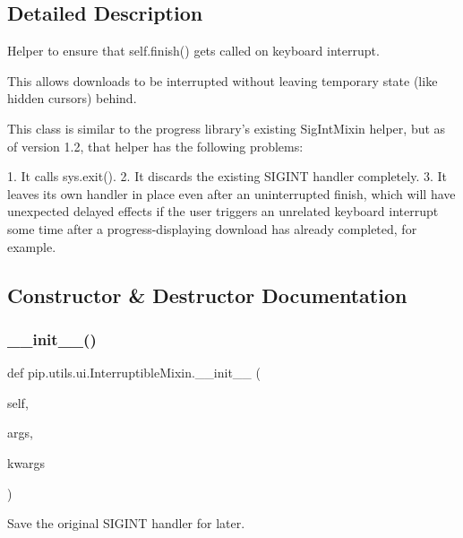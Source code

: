 \subsection{Detailed Description}
\begin{DoxyVerb}Helper to ensure that self.finish() gets called on keyboard interrupt.

This allows downloads to be interrupted without leaving temporary state
(like hidden cursors) behind.

This class is similar to the progress library's existing SigIntMixin
helper, but as of version 1.2, that helper has the following problems:

1. It calls sys.exit().
2. It discards the existing SIGINT handler completely.
3. It leaves its own handler in place even after an uninterrupted finish,
   which will have unexpected delayed effects if the user triggers an
   unrelated keyboard interrupt some time after a progress-displaying
   download has already completed, for example.
\end{DoxyVerb}
 

\subsection{Constructor \& Destructor Documentation}
\mbox{\label{classpip_1_1utils_1_1ui_1_1_interruptible_mixin_a2af170c5c8ea547803596b94fd457f35}} 
\subsubsection{\texorpdfstring{\+\_\+\+\_\+init\+\_\+\+\_\+()}{\_\_init\_\_()}}
{\footnotesize\ttfamily def pip.\+utils.\+ui.\+Interruptible\+Mixin.\+\_\+\+\_\+init\+\_\+\+\_\+ (\begin{DoxyParamCaption}\item[{}]{self,  }\item[{}]{args,  }\item[{}]{kwargs }\end{DoxyParamCaption})}

\begin{DoxyVerb}Save the original SIGINT handler for later.
\end{DoxyVerb}
 

